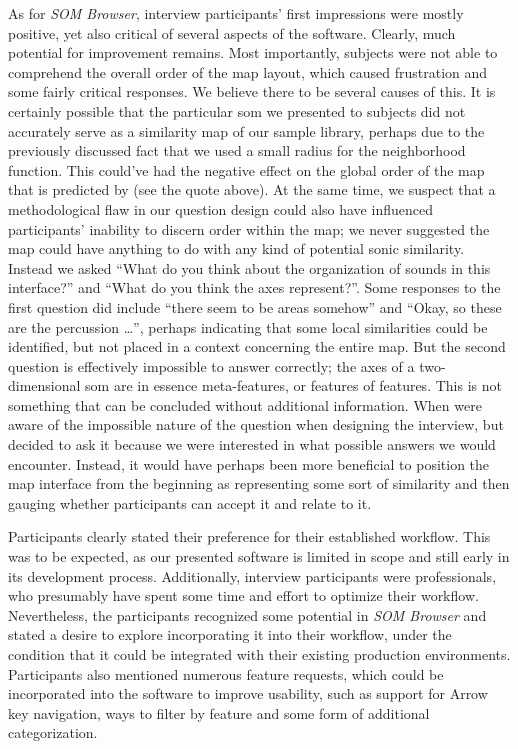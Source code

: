 As for \textit{SOM Browser}, interview participants' first impressions were
mostly positive, yet also critical of several aspects of the software. Clearly,
much potential for improvement remains. Most importantly, subjects were not
able to comprehend the overall order of the map layout, which caused
frustration and some fairly critical responses. We believe there to be several
causes of this. It is certainly possible that the particular \gls{som} we
presented to subjects did not accurately serve as a similarity map of our
sample library, perhaps due to the previously discussed fact that we used a
small radius for the neighborhood function. This could've had the negative
effect on the global order of the map that is predicted by \citet{kohonen1990}
(see the quote above). At the same time, we suspect that a methodological flaw
in our question design could also have influenced participants' inability to
discern order within the map; we never suggested the map could have anything to
do with any kind of potential sonic similarity. Instead we asked ``What do you
think about the organization of sounds in this interface?'' and
``What do you think the axes represent?''. Some responses to the first question
did include ``there seem to be areas somehow'' and ``Okay, so these are the
percussion \dots'', perhaps indicating that some local similarities could be
identified, but not placed in a context concerning the entire map. But the
second question is effectively impossible to answer correctly; the axes of a
two-dimensional \gls{som} are in essence meta-features, or features of features.
This is not something that can be concluded without additional information.
When were aware of the impossible nature of the question when designing the
interview, but decided to ask it because we were interested in what possible
answers we would encounter. Instead, it would have perhaps been more beneficial
to position the map interface from the beginning as representing some sort of
similarity and then gauging whether participants can accept it and relate to it.

\smallskip

Participants clearly stated their preference for their established workflow.
This was to be expected, as our presented software is limited in scope and still
early in its development process. Additionally, interview participants were
professionals, who presumably have spent some time and effort to optimize their
workflow. Nevertheless, the participants recognized some potential in
\textit{SOM Browser} and stated a desire to explore incorporating it into their
workflow, under the condition that it could be integrated with their existing
production environments. Participants also mentioned numerous feature requests,
which could be incorporated into the software to improve usability, such as
support for Arrow key navigation, ways to filter by feature and some form of
additional categorization.

